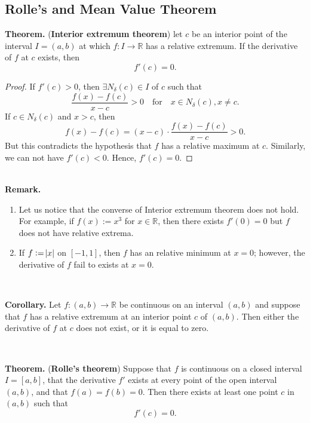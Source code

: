 \documentclass[12pt,a4paper]{article}
\begin{document}
\subsection{Rolle's and Mean Value Theorem}
\begin{tcolorbox}[colback=white]
	\textbf{Theorem.} (\textbf{Interior extremum theorem}) let $c$ be an interior point of the interval $I=(a,b)$ at which $f:I\to\mathbb{R}$ has a relative extremum. If the derivative of $f$ at $c$ exists, then \[
	f'(c)=0.
	\]\tcblower\begin{proof}
		If $f'(c)>0$, then $\exists N_\delta(c)\in I$ of $c$ such that \[
		\frac{f(x)-f(c)}{x-c}>0\quad\text{for}\quad x\in N_\delta(c), x\neq c.
		\] If $c\in N_\delta(c)$ and $x>c$, then \[
		f(x)-f(c)=(x-c)\cdot\frac{f(x)-f(c)}{x-c}>0.
		\] But this contradicts the hypothesis that $f$ has a relative maximum at $c$. Similarly, we can not have $f'(c)<0$. Hence, $f'(c)=0$.
	\end{proof}
\end{tcolorbox}\
\\
\textbf{Remark.} \ \begin{enumerate}
	\item Let us notice that the converse of Interior extremum theorem does not hold. For example, if $f(x):=x^3$ for $x\in\mathbb{R}$, then there exists $f'(0)=0$ but $f$ does not have relative extrema.
	\item If $f:=\abs{x}$ on $[-1,1]$, then $f$ has an relative minimum at $x=0$; however, the derivative of $f$ fail to exists at $x=0$.
\end{enumerate}
\
\begin{tcolorbox}[colback=white]
	\textbf{Corollary.} Let $f:(a,b)\to\mathbb{R}$ be continuous on an interval $(a,b)$ and suppose that $f$ has a relative extremum at an interior point $c$ of $(a,b)$. Then either the derivative of $f$ at $c$ does not exist, or it is equal to zero.
\end{tcolorbox}
\
\begin{tcolorbox}[colback=white]
	\textbf{Theorem.} (\textbf{Rolle's theorem}) Suppose that $f$ is continuous on a closed interval $I=[a,b]$, that the derivative $f'$ exists at every point of the open interval $(a,b)$, and that $f(a)=f(b)=0$. Then there exists at least one point $c$ in $(a,b)$ such that \[
	f'(c)=0.
	\]
\end{tcolorbox}
\end{document}
